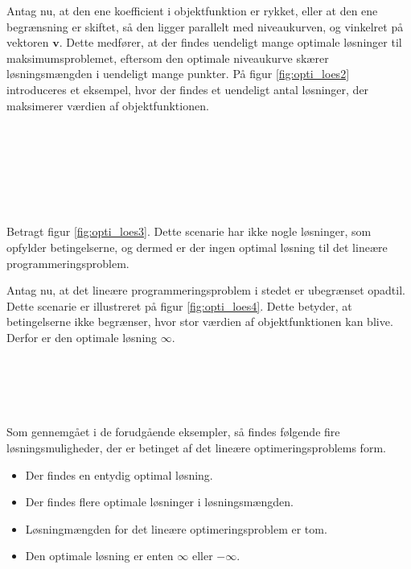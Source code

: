 Antag nu, at den ene koefficient i objektfunktion er rykket, eller at den ene begrænsning er skiftet, så den ligger parallelt med niveaukurven, og vinkelret på vektoren $\textbf{v}$.
Dette medfører, at der findes uendeligt mange optimale løsninger til maksimumsproblemet, eftersom den optimale niveaukurve skærer løsningsmængden i uendeligt mange punkter.
På figur \ref{fig:opti_loes2} introduceres et eksempel, hvor der findes et uendeligt antal løsninger, der
maksimerer værdien af objektfunktionen. 
%
\newline
\phantom{Hej}
\\\\
\phantom{Hej}
\\\\
\phantom{Hej}
\\\\
\phantom{Hej}
\\\\
%

%
\noindent
%
Betragt figur \ref{fig:opti_loes3}.
Dette scenarie har ikke nogle løsninger, som opfylder betingelserne, og dermed er der ingen optimal løsning til det lineære programmeringsproblem. 
%

%
\noindent
%
Antag nu, at det lineære programmeringsproblem i stedet er ubegrænset opadtil.
Dette scenarie er illustreret på figur \ref{fig:opti_loes4}.
%
Dette betyder, at betingelserne ikke begrænser, hvor stor
værdien af objektfunktionen kan blive. 
Derfor er den optimale løsning $\infty$.
%
\phantom{Hej}
\\\\
\phantom{Hej}
\\\\
\phantom{Hej}
\\\\
%

%
\noindent
%
Som gennemgået i de forudgående eksempler, så findes følgende fire løsningsmuligheder, der er betinget af det lineære optimeringsproblems form.
%
\begin{itemize}
\item Der findes en entydig optimal løsning.
\item Der findes flere optimale løsninger i løsningsmængden.
\item Løsningmængden for det lineære optimeringsproblem er tom. 
\item Den optimale løsning er enten $\infty$ eller $-\infty$.
\end{itemize}
%
